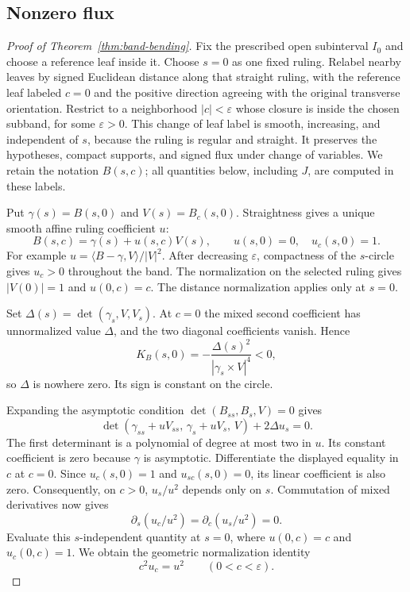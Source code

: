 \documentclass[11pt]{amsart}
\theoremstyle{definition}
\begin{document}
\subsection{Nonzero flux}

\begin{proof}[Proof of Theorem~\ref{thm:band-bending}]
Fix the prescribed open subinterval $I_0$ and choose a reference
leaf inside it. Choose $s=0$ as one fixed ruling. Relabel nearby
leaves by signed Euclidean distance along that straight ruling,
with the reference leaf labeled $c=0$ and the positive direction
agreeing with the original transverse orientation.
Restrict to a neighborhood $|c|<\varepsilon$ whose closure is
inside the chosen subband, for some $\varepsilon>0$.
This change of leaf label is smooth, increasing, and independent
of $s$, because the ruling is regular and straight.
It preserves the hypotheses, compact supports, and signed flux
under change of variables. We retain the notation $B(s,c)$;
all quantities below, including $J$, are computed in these labels.

Put $\gamma(s)=B(s,0)$ and $V(s)=B_c(s,0)$.
Straightness gives a unique smooth affine ruling coefficient $u$:
\[
 B(s,c)=\gamma(s)+u(s,c)V(s),\qquad
 u(s,0)=0,\quad u_c(s,0)=1.
\]
For example $u=\langle B-\gamma,V\rangle/|V|^2$.
After decreasing $\varepsilon$, compactness of the $s$-circle
gives $u_c>0$ throughout the band.
The normalization on the selected ruling gives
$|V(0)|=1$ and $u(0,c)=c$.
The distance normalization applies only at $s=0$.

Set $\Delta(s)=\det(\gamma_s,V,V_s)$.
At $c=0$ the mixed second coefficient has unnormalized value
$\Delta$, and the two diagonal coefficients vanish. Hence
\[
 K_B(s,0)=-\frac{\Delta(s)^2}{|\gamma_s\times V|^4}<0,
\]
so $\Delta$ is nowhere zero. Its sign is constant on the circle.

Expanding the asymptotic condition
$\det(B_{ss},B_s,V)=0$ gives
\[
 \det(\gamma_{ss}+uV_{ss},\,\gamma_s+uV_s,\,V)
                                  +2\Delta u_s=0.
\]
The first determinant is a polynomial of degree at most two in $u$.
Its constant coefficient is zero because $\gamma$ is asymptotic.
Differentiate the displayed equality in $c$ at $c=0$.
Since $u_c(s,0)=1$ and $u_{sc}(s,0)=0$, its linear
coefficient is also zero.
Consequently, on $c>0$, $u_s/u^2$ depends only on $s$.
Commutation of mixed derivatives now gives
\[
 \partial_s(u_c/u^2)=\partial_c(u_s/u^2)=0.
\]
Evaluate this $s$-independent quantity at $s=0$, where
$u(0,c)=c$ and $u_c(0,c)=1$. We obtain the geometric
normalization identity
\begin{equation}\label{eq:ruling-normalization}
 c^2u_c=u^2\qquad(0<c<\varepsilon).
\end{equation}


\end{proof}
\end{document}
